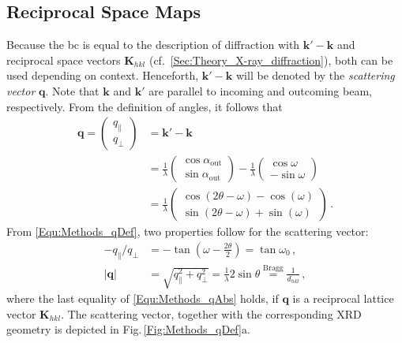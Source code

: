 \subsection{Reciprocal Space Maps}
    \label{Sec:Methods_RSM}
Because the \gls{bc} is equal to the description of diffraction with $\mathbf{k}'-\mathbf{k}$ and reciprocal space vectors $\mathbf{K}_{hkl}$ (cf.~\ref{Sec:Theory_X-ray_diffraction}), both can be used depending on context.
Henceforth, $\mathbf{k}'-\mathbf{k}$ will be denoted by the \emph{scattering vector} $\mathbf{q}$.
Note that $\mathbf{k}$ and $\mathbf{k}'$ are parallel to incoming and outcoming beam, respectively.
From the definition of angles, it follows that
\begin{align}
    \mathbf{q}
    =\begin{pmatrix}
        q_\parallel\\
        q_\perp
    \end{pmatrix}
    &=\mathbf{k}'-\mathbf{k}\\
    &=\frac{1}{\lambda}
    \begin{pmatrix}
        \cos\alpha_\mathrm{out}\\
        \sin\alpha_\mathrm{out}
    \end{pmatrix}
    -\frac{1}{\lambda}
    \begin{pmatrix}
        \cos\omega\\
        -\sin\omega
    \end{pmatrix}\\
    &=\frac{1}{\lambda}
    \begin{pmatrix}
        \cos(2\theta-\omega)-\cos(\omega)\\
        \sin(2\theta-\omega)+\sin(\omega)
    \end{pmatrix}\,.
    \label{Equ:Methods_qDef}
\end{align}
From \eqref{Equ:Methods_qDef}, two properties follow for the scattering vector:
\begin{align}
    -q_\parallel/q_\perp&=-\tan\left(\omega-\frac{2\theta}{2}\right)=\tan\omega_0
        \label{Equ:Methods_qDir}\,,\\
    \left|\mathbf{q}\right|&=\sqrt{q_\parallel^2+q_\perp^2}=\frac{1}{\lambda}2\sin\theta\overset{\mathrm{Bragg}}{=}\frac{1}{d_{hkl}}\,,
    \label{Equ:Methods_qAbs}
\end{align}
where the last equality of \eqref{Equ:Methods_qAbs} holds, if $\mathbf{q}$ is a reciprocal lattice vector $\mathbf{K}_{hkl}$.
The scattering vector, together with the corresponding \gls{XRD} geometry is depicted in Fig.\,\ref{Fig:Methods_qDef}a.
